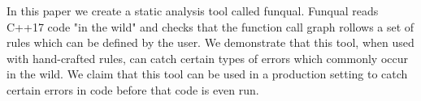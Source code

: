 In this paper we create a static analysis tool called funqual.  Funqual reads C++17 code "in the wild" and checks that the function call graph rollows a set of rules which can be defined by the user.  We demonstrate that this tool, when used with hand-crafted rules, can catch certain types of errors which commonly occur in the wild.  We claim that this tool can be used in a production setting to catch certain errors in code before that code is even run.  
